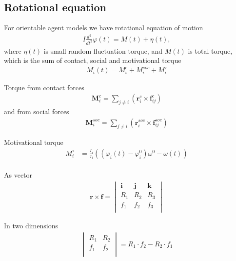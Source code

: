 \subsection{Rotational equation}

For orientable agent models we have rotational equation of motion
\begin{align}
I \frac{d^{2}}{d t^{2}} \varphi(t) = M(t) + \eta(t),
\end{align}
where $ \eta(t) $ is small random fluctuation torque, and $ M(t) $ is total torque, which is the sum of contact, social and motivational torque
\begin{align}
M_{i}(t) = M_{i}^{c} + M_{i}^{soc} + M_{i}^{\tau}
\end{align}

Torque from contact forces
\begin{align}
\mathbf{M}_{i}^{c} = \sum_{j\neq i}^{} \left(\mathbf{r}_{i}^{c} \times \mathbf{f}_{ij}^{c}\right)
\end{align}
and from social forces
\begin{align}
\mathbf{M}_{i}^{soc} = \sum_{j\neq i}^{} \left(\mathbf{r}_{i}^{soc} \times \mathbf{f}_{ij}^{soc}\right)
\end{align}

Motivational torque
\begin{align}
M_{i}^{\tau} &= \frac{I_{i}}{\tau_{i}} \left((\varphi_{i}(t) - \varphi_{i}^{0}) \omega^{0} - \omega(t)\right) \\
\end{align}

As vector
\begin{align}
\mathbf{r} \times \mathbf{f} =  \begin{vmatrix} \mathbf{i} & \mathbf{j} & \mathbf{k} \\ R_{1} & R_{2} & R_{3} \\ f_{1} & f_{2} & f_{3} \\ \end{vmatrix} 
\end{align}

In two dimensions
\begin{align}
\begin{vmatrix} R_{1} & R_{2} \\ f_{1} & f_{2} \\ \end{vmatrix} = R_{1} \cdot f_{2} - R_{2} \cdot f_{1}
\end{align}
